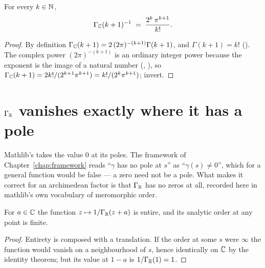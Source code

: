 \begin{lemma}
  \label{lem:gammaC-natCast}
  \leanok
  For every $k \in \mathbb{N}$,
  \[ \Gamma_{\mathbb{C}}(k+1)^{-1} \;=\; \frac{2^{k}\,\pi^{k+1}}{k!}. \]
\end{lemma}
\begin{proof}
  \leanok
  By definition $\Gamma_{\mathbb{C}}(k+1) = 2\,(2\pi)^{-(k+1)}\Gamma(k+1)$, and
  $\Gamma(k+1) = k!$ (). The complex power
  $(2\pi)^{-(k+1)}$ is an ordinary integer power because the exponent is the image of a
  natural number (, ), so
  $\Gamma_{\mathbb{C}}(k+1) = 2k!/(2^{k+1}\pi^{k+1}) = k!/(2^{k}\pi^{k+1})$; invert.
\end{proof}

\section{$\Gamma_{\mathbb{R}}$ vanishes exactly where it has a pole}

Mathlib's  takes the value $0$ at its poles. The framework of
Chapter~\ref{chap:framework} reads ``$\gamma$ has no pole at $s$'' as ``$\gamma(s) \neq 0$'',
which for a general function would be false --- a zero need not be a pole. What makes it correct
for an archimedean factor is that $\Gamma_{\mathbb{R}}$ has no zeros at all, recorded here in mathlib's
own vocabulary of meromorphic order.

\begin{lemma}
  \label{lem:inv-GammaR-entire}
  \leanok
  For $a \in \mathbb{C}$ the function $z \mapsto 1/\Gamma_{\mathbb{R}}(z+a)$ is entire, and its analytic order
  at any point is finite.
\end{lemma}
\begin{proof}
  \leanok
  Entirety is  composed with a translation. If the
  order at some $s$ were $\infty$ the function would vanish on a neighbourhood of $s$, hence
  identically on $\mathbb{C}$ by the identity theorem; but its value at $1-a$ is $1/\Gamma_{\mathbb{R}}(1) = 1$.
\end{proof}

